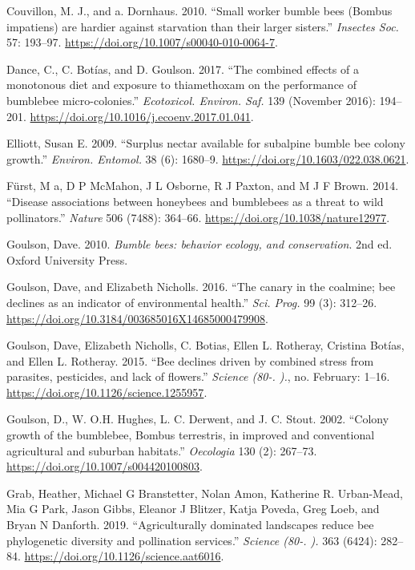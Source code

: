 \documentclass[11pt,]{article}
\begin{document}
\leavevmode\hypertarget{ref-Couvillon2010}{}%
Couvillon, M. J., and a. Dornhaus. 2010. ``Small worker bumble bees
(Bombus impatiens) are hardier against starvation than their larger
sisters.'' \emph{Insectes Soc.} 57: 193--97.
\url{https://doi.org/10.1007/s00040-010-0064-7}.

\leavevmode\hypertarget{ref-Dance2017}{}%
Dance, C., C. Botías, and D. Goulson. 2017. ``The combined effects of a
monotonous diet and exposure to thiamethoxam on the performance of
bumblebee micro-colonies.'' \emph{Ecotoxicol. Environ. Saf.} 139
(November 2016): 194--201.
\url{https://doi.org/10.1016/j.ecoenv.2017.01.041}.

\leavevmode\hypertarget{ref-Elliott2009}{}%
Elliott, Susan E. 2009. ``Surplus nectar available for subalpine bumble
bee colony growth.'' \emph{Environ. Entomol.} 38 (6): 1680--9.
\url{https://doi.org/10.1603/022.038.0621}.

\leavevmode\hypertarget{ref-Furst2014}{}%
Fürst, M a, D P McMahon, J L Osborne, R J Paxton, and M J F Brown. 2014.
``Disease associations between honeybees and bumblebees as a threat to
wild pollinators.'' \emph{Nature} 506 (7488): 364--66.
\url{https://doi.org/10.1038/nature12977}.

\leavevmode\hypertarget{ref-Goulson2008}{}%
Goulson, Dave. 2010. \emph{Bumble bees: behavior ecology, and
conservation}. 2nd ed. Oxford University Press.

\leavevmode\hypertarget{ref-Goulson2016}{}%
Goulson, Dave, and Elizabeth Nicholls. 2016. ``The canary in the
coalmine; bee declines as an indicator of environmental health.''
\emph{Sci. Prog.} 99 (3): 312--26.
\url{https://doi.org/10.3184/003685016X14685000479908}.

\leavevmode\hypertarget{ref-Goulson2015c}{}%
Goulson, Dave, Elizabeth Nicholls, C. Botias, Ellen L. Rotheray,
Cristina Botías, and Ellen L. Rotheray. 2015. ``Bee declines driven by
combined stress from parasites, pesticides, and lack of flowers.''
\emph{Science (80-. ).}, no. February: 1--16.
\url{https://doi.org/10.1126/science.1255957}.

\leavevmode\hypertarget{ref-Goulson2002c}{}%
Goulson, D., W. O.H. Hughes, L. C. Derwent, and J. C. Stout. 2002.
``Colony growth of the bumblebee, Bombus terrestris, in improved and
conventional agricultural and suburban habitats.'' \emph{Oecologia} 130
(2): 267--73. \url{https://doi.org/10.1007/s004420100803}.

\leavevmode\hypertarget{ref-Grab2019}{}%
Grab, Heather, Michael G Branstetter, Nolan Amon, Katherine R.
Urban-Mead, Mia G Park, Jason Gibbs, Eleanor J Blitzer, Katja Poveda,
Greg Loeb, and Bryan N Danforth. 2019. ``Agriculturally dominated
landscapes reduce bee phylogenetic diversity and pollination services.''
\emph{Science (80-. ).} 363 (6424): 282--84.
\url{https://doi.org/10.1126/science.aat6016}.
\end{document}
